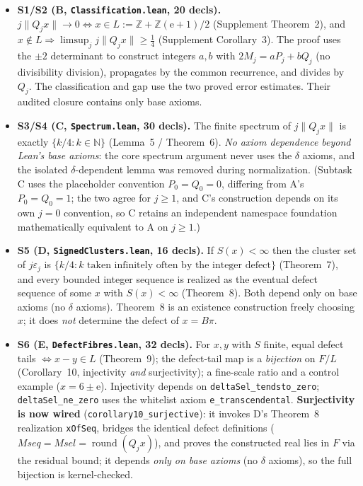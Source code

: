 \documentclass[11pt]{amsart}
\theoremstyle{definition}
\theoremstyle{remark}
\numberwithin{equation}{section}
\newcommand{\Z}{\mathbb{Z}}
\newcommand{\N}{\mathbb{N}}
\newcommand{\ee}{\mathrm{e}}
\begin{document}
\begin{itemize}
\item \textbf{S1/S2 (B, \texttt{Classification.lean}, 20 decls).} $j\|Q_j x\|\to0\iff x\in L:=\Z+\Z(\ee+1)/2$ (Supplement Theorem~2), and $x\notin L\Rightarrow\limsup_j j\|Q_j x\|\ge\tfrac14$ (Supplement Corollary~3). The proof uses the $\pm2$ determinant to construct integers $a,b$ with $2M_j=aP_j+bQ_j$ (no divisibility division), propagates by the common recurrence, and divides by $Q_j$. The classification and gap use the two proved error estimates. Their audited closure contains only base axioms.
\item \textbf{S3/S4 (C, \texttt{Spectrum.lean}, 30 decls).} The finite spectrum of $j\|Q_j x\|$ is exactly $\{k/4:k\in\N\}$ (Lemma~5 / Theorem~6). \emph{No axiom dependence beyond Lean's base axioms}: the core spectrum argument never uses the $\delta$ axioms, and the isolated $\delta$-dependent lemma was removed during normalization. (Subtask C uses the placeholder convention $P_0=Q_0=0$, differing from A's $P_0=Q_0=1$; the two agree for $j\ge1$, and C's construction depends on its own $j=0$ convention, so C retains an independent namespace foundation mathematically equivalent to A on $j\ge1$.)
\item \textbf{S5 (D, \texttt{SignedClusters.lean}, 16 decls).} If $S(x)<\infty$ then the cluster set of $j\varepsilon_j$ is $\{k/4:k\text{ taken infinitely often by the integer defect}\}$ (Theorem~7), and every bounded integer sequence is realized as the eventual defect sequence of some $x$ with $S(x)<\infty$ (Theorem~8). Both depend only on base axioms (no $\delta$ axioms). Theorem~8 is an existence construction freely choosing $x$; it does \emph{not} determine the defect of $x=B\pi$.
\item \textbf{S6 (E, \texttt{DefectFibres.lean}, 32 decls).} For $x,y$ with $S$ finite, equal defect tails $\iff x-y\in L$ (Theorem~9); the defect-tail map is a \emph{bijection} on $F/L$ (Corollary~10, injectivity \emph{and} surjectivity); a fine-scale ratio and a control example ($x=6\pm\ee$). Injectivity depends on \texttt{deltaSel\_\allowbreak{}tendsto\_\allowbreak{}zero}; \texttt{deltaSel\_\allowbreak{}ne\_\allowbreak{}zero} uses the whitelist axiom \texttt{e\_\allowbreak{}transcendental}. \textbf{Surjectivity is now wired} (\texttt{corollary10\_\allowbreak{}surjective}): it invokes D's Theorem~8 realization \texttt{xOfSeq}, bridges the identical defect definitions ($Mseq=Msel=\operatorname{round}(Q_j x)$), and proves the constructed real lies in $F$ via the residual bound; it depends \emph{only on base axioms} (no $\delta$ axioms), so the full bijection is kernel-checked.

\end{itemize}
\end{document}
